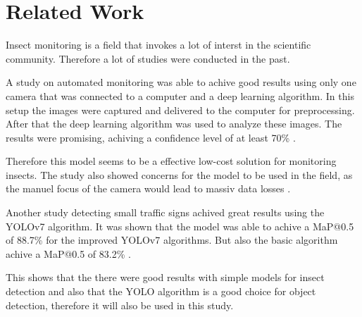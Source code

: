 \chapter{Related Work}
\label{ch:related_work}

Insect monitoring is a field that invokes a lot of interst in the scientific community. Therefore a lot of studies were conducted in the past. 

A study on automated monitoring was able to achive good results using only one camera that was connected to a computer and a deep learning algorithm. In this setup the images were captured and delivered to the computer for preprocessing. After that the deep learning algorithm was used to analyze these images. The results were promising, achiving a confidence level of at least 70\% \citep{mendoza2023}. 

Therefore this model seems to be a effective low-cost solution for monitoring insects. The study also showed concerns for the model to be used in the field, as the manuel focus of the camera would lead to massiv data losses \citep{mendoza2023}. 

Another study detecting small traffic signs achived great results using the YOLOv7 algorithm. It was shown that the model was able to achive a MaP@0.5 of 88.7\% for the improved YOLOv7 algorithms. But also the basic algorithm achive a MaP@0.5 of 83.2\% \citep{li2023}. 

This shows that the there were good results with simple models for insect detection and also that the YOLO algorithm is a good choice for object detection, therefore it will also be used in this study. 